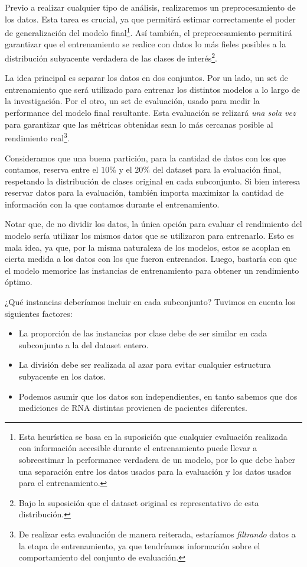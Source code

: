 Previo a realizar cualquier tipo de análisis, realizaremos un preprocesamiento de los datos. Esta tarea es crucial, ya que  permitirá estimar correctamente el poder de generalización del modelo final\footnote{Esta heurística se basa en la suposición que cualquier evaluación realizada con información accesible durante el entrenamiento puede llevar a sobreestimar la performance verdadera de un modelo, por lo que debe haber una separación entre los datos usados para la evaluación y los datos usados para el entrenamiento.}. Así también, el preprocesamiento permitirá garantizar que el entrenamiento se realice con datos lo más fieles posibles a la distribución subyacente verdadera de las clases de interés\footnote{Bajo la suposición que el dataset original es representativo de esta distribución.}. 

La idea principal es separar los datos en dos conjuntos. Por un lado, un set de entrenamiento que será utilizado para entrenar los distintos modelos a lo largo de la investigación. Por el otro, un set de evaluación, usado para medir la performance del modelo final resultante. Esta evaluación se relizará \textit{una sola vez} para garantizar que las métricas obtenidas sean lo más cercanas posible al rendimiento real\footnote{De realizar esta evaluación de manera reiterada, estaríamos \textit{filtrando} datos a la etapa de entrenamiento, ya que tendríamos información sobre el comportamiento del conjunto de evaluación.}.

Consideramos que una buena partición, para la cantidad de datos con los que contamos, reserva entre el $10\%$ y el $20\%$ del dataset para la evaluación final, respetando la distribución de clases original en cada subconjunto. Si bien interesa reservar datos para la evaluación, también importa maximizar la cantidad de información con la que contamos durante el entrenamiento.

Notar que, de no dividir los datos, la única opción para evaluar el rendimiento del modelo sería utilizar los mismos datos que se utilizaron para entrenarlo. Esto es mala idea, ya que, por la misma naturaleza de los modelos, estos se acoplan en cierta medida a los datos con los que fueron entrenados. Luego, bastaría con que el modelo memorice las instancias de entrenamiento para obtener un rendimiento óptimo.

¿Qué instancias deberíamos incluir en cada subconjunto? Tuvimos en cuenta los siguientes factores:

\begin{itemize}
    \item La proporción de las instancias por clase debe de ser similar en cada subconjunto a la del dataset entero.
    \item La división debe ser realizada al azar para evitar cualquier estructura subyacente en los datos.
    \item Podemos asumir que los datos son independientes, en tanto sabemos que dos mediciones de RNA distintas provienen de pacientes diferentes. 
\end{itemize}

